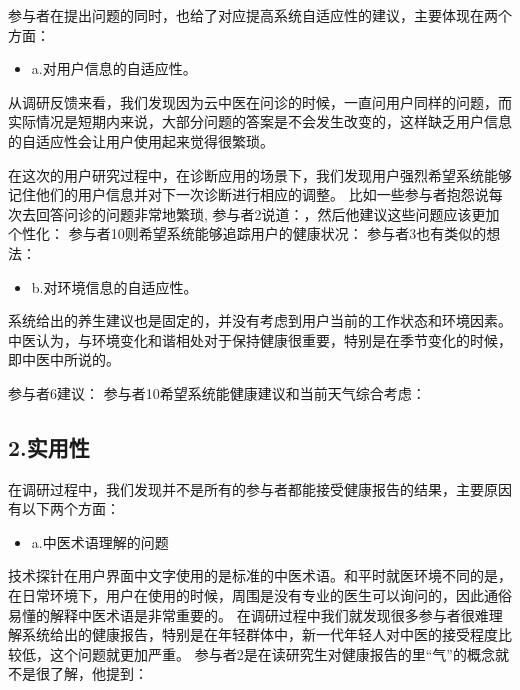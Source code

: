 参与者在提出问题的同时，也给了对应提高系统自适应性的建议，主要体现在两个方面：

\begin{itemize}
\item a.对用户信息的自适应性。
\end{itemize}

从调研反馈来看，我们发现因为云中医在问诊的时候，一直问用户同样的问题，而实际情况是短期内来说，大部分问题的答案是不会发生改变的，这样缺乏用户信息的自适应性会让用户使用起来觉得很繁琐。

在这次的用户研究过程中，在诊断应用的场景下，我们发现用户强烈希望系统能够记住他们的用户信息并对下一次诊断进行相应的调整。
比如一些参与者抱怨说每次去回答问诊的问题非常地繁琐, 参与者2说道：，然后他建议这些问题应该更加个性化：
参与者10则希望系统能够追踪用户的健康状况：
参与者3也有类似的想法：

\begin{itemize}
\item b.对环境信息的自适应性。
\end{itemize}

系统给出的养生建议也是固定的，并没有考虑到用户当前的工作状态和环境因素。中医认为，与环境变化和谐相处对于保持健康很重要，特别是在季节变化的时候，即中医中所说的。

参与者6建议： 
参与者10希望系统能健康建议和当前天气综合考虑：


\subsection{2.实用性}
在调研过程中，我们发现并不是所有的参与者都能接受健康报告的结果，主要原因有以下两个方面：

\begin{itemize}
\item a.中医术语理解的问题
\end{itemize}

技术探针在用户界面中文字使用的是标准的中医术语。和平时就医环境不同的是，在日常环境下，用户在使用的时候，周围是没有专业的医生可以询问的，因此通俗易懂的解释中医术语是非常重要的。
在调研过程中我们就发现很多参与者很难理解系统给出的健康报告，特别是在年轻群体中，新一代年轻人对中医的接受程度比较低，这个问题就更加严重。
参与者2是在读研究生对健康报告的里“气”的概念就不是很了解，他提到：

